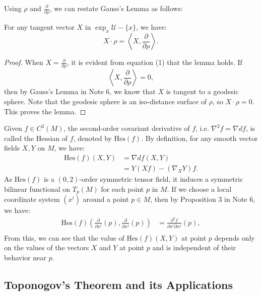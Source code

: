 \documentclass{ctexart}
\begin{document}
Using $\rho$ and $\frac{\partial}{\partial \rho}$, we can restate Gauss's Lemma as follows:
\begin{lemma}
  For any tangent vector $X$ in $\exp _x \mathcal{U}-\{x\}$, we have:
  $$
  X \cdot \rho=\left\langle X, \frac{\partial}{\partial \rho}\right\rangle.
  $$  
\end{lemma}
\begin{proof}[Proof]
  When $X=\frac{\partial}{\partial \rho}$, it is evident from equation (1) that the lemma holds. If
  $$
  \left\langle X, \frac{\partial}{\partial \rho}\right\rangle=0,
  $$
  then by Gauss's Lemma in Note 6, we know that $X$ is tangent to a geodesic sphere. Note that the geodesic sphere is an iso-distance surface of $\rho$, so $X \cdot \rho=0$. This proves the lemma.  
\end{proof}

Given $f\in C^2(M)$, the second-order covariant derivative of $f$, i.e. $\nabla^2 f = \nabla df$, is called the Hessian of $f$, denoted by $\text{Hes}(f)$. 
By definition, for any smooth vector fields $X, Y$ on $M$, we have:
$$
\begin{aligned}
\text{Hes}(f)(X, Y) &= \nabla df(X, Y) \\
&= Y(Xf) - (\nabla_X Y)f.
\end{aligned}
$$
As $\text{Hes}(f)$ is a $(0,2)$-order symmetric tensor field, 
it induces a symmetric bilinear functional on $T_p(M)$ for each point $p$ in $M$.
If we choose a local coordinate system $(x^i)$ around a point $p \in M$, then by Proposition 3 in Note 6, we have:
$$
\begin{aligned}
\text{Hes}(f)\left(\frac{\partial}{\partial x^i}(p), \frac{\partial}{\partial x^j}(p)\right) &= \frac{\partial^2 f}{\partial x^i \partial x^j}(p), \\
\end{aligned}
$$
From this, we can see that the value of $\text{Hes}(f)(X, Y)$ at point $p$ depends only on the values of the vectors $X$ and $Y$ at point $p$ and is independent of their behavior near $p$.

\subsection*{Toponogov's Theorem and its Applications}
\end{document}
